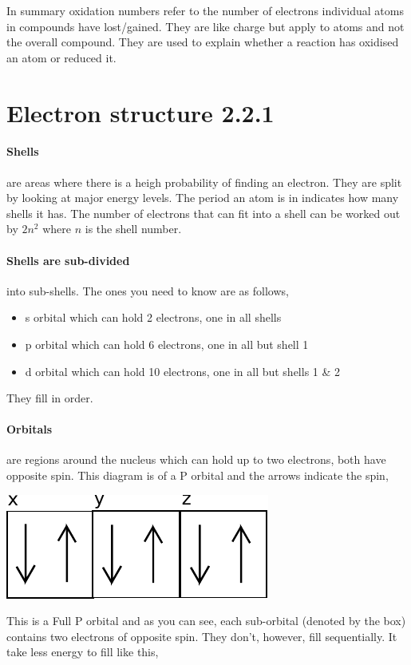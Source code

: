	In summary oxidation numbers refer to the number of electrons individual atoms in compounds have lost/gained.
	They are like charge but apply to atoms and not the overall compound.
	They are used to explain whether a reaction has oxidised an atom or reduced it.
	
\section{Electron structure 2.2.1}

	\paragraph{Shells} are areas where there is a heigh probability of finding an electron.
	They are split by looking at major energy levels.
	The period an atom is in indicates how many shells it has.
	The number of electrons that can fit into a shell can be worked out by $2n^2$ where $n$ is the shell number.
	
	\paragraph{Shells are sub-divided} into sub-shells. The ones you need to know are as follows,
	\begin{itemize}
		\item s orbital which can hold 2 electrons, one in all shells
		\item p orbital which can hold 6 electrons, one in all but shell 1
		\item d orbital which can hold 10 electrons, one in all but shells 1 \& 2
	\end{itemize}
	They fill in order.
	
	\paragraph{Orbitals} are regions around the nucleus which can hold up to two electrons, both have opposite spin.
	This diagram is of a P orbital and the arrows indicate the spin,

	\begin{center}
		\includegraphics{Porbital}

	\end{center}
	This is a Full P orbital and as you can see, each sub-orbital (denoted by the box) contains two electrons of opposite spin.
	They don't, however, fill sequentially. It take less energy to fill like this,

